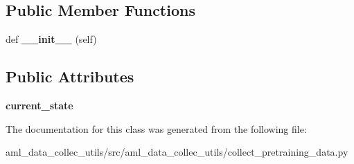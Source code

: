 \subsection*{Public Member Functions}
\begin{DoxyCompactItemize}
\item 
\hypertarget{classaml__data__collec__utils_1_1collect__pretraining__data_1_1_agent_proxy_a3ab6c2768994ad0a42160cbb1c8e4cfa}{}\label{classaml__data__collec__utils_1_1collect__pretraining__data_1_1_agent_proxy_a3ab6c2768994ad0a42160cbb1c8e4cfa} 
def {\bfseries \+\_\+\+\_\+init\+\_\+\+\_\+} (self)
\end{DoxyCompactItemize}
\subsection*{Public Attributes}
\begin{DoxyCompactItemize}
\item 
\hypertarget{classaml__data__collec__utils_1_1collect__pretraining__data_1_1_agent_proxy_aeb2225b6b78553e00dfa022cd7bafd49}{}\label{classaml__data__collec__utils_1_1collect__pretraining__data_1_1_agent_proxy_aeb2225b6b78553e00dfa022cd7bafd49} 
{\bfseries current\+\_\+state}
\end{DoxyCompactItemize}


The documentation for this class was generated from the following file\+:\begin{DoxyCompactItemize}
\item 
aml\+\_\+data\+\_\+collec\+\_\+utils/src/aml\+\_\+data\+\_\+collec\+\_\+utils/collect\+\_\+pretraining\+\_\+data.\+py\end{DoxyCompactItemize}
